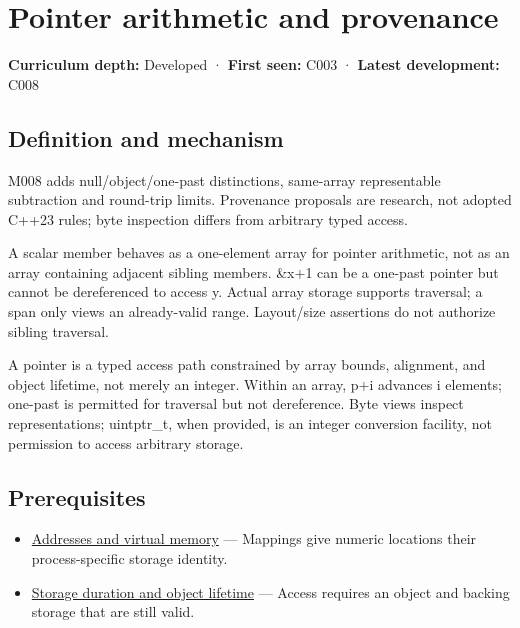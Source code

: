 \hypertarget{appendix-6af5921bc853}{}\label{referencestart:appendix-6af5921bc853}
\section{Pointer arithmetic and provenance}\label{appendix-6af5921bc853-pointer-arithmetic-and-provenance}

\textbf{Curriculum depth:} Developed · \textbf{First seen:} C003 · \textbf{Latest development:} C008

\subsection{Definition and mechanism}\label{appendix-6af5921bc853-definition-and-mechanism}

M008 adds null/object/one-past distinctions, same-array representable subtraction and round-trip limits. Provenance proposals are research, not adopted C++23 rules; byte inspection differs from arbitrary typed access.

A scalar member behaves as a one-element array for pointer arithmetic, not as an array containing adjacent sibling members. \&x+1 can be a one-past pointer but cannot be dereferenced to access y. Actual array storage supports traversal; a span only views an already-valid range. Layout/size assertions do not authorize sibling traversal.

A pointer is a typed access path constrained by array bounds, alignment, and object lifetime, not merely an integer. Within an array, p+i advances i elements; one-past is permitted for traversal but not dereference. Byte views inspect representations; uintptr\_t, when provided, is an integer conversion facility, not permission to access arbitrary storage.

\subsection{Prerequisites}\label{appendix-6af5921bc853-prerequisites}

\begin{itemize}
\tightlist
\item
  \hyperref[appendix-18ee4f913c3c]{Addresses and virtual memory} --- Mappings give numeric locations their process-specific storage identity.
\item
  \hyperref[appendix-0b104bcba06b]{Storage duration and object lifetime} --- Access requires an object and backing storage that are still valid.
\end{itemize}

